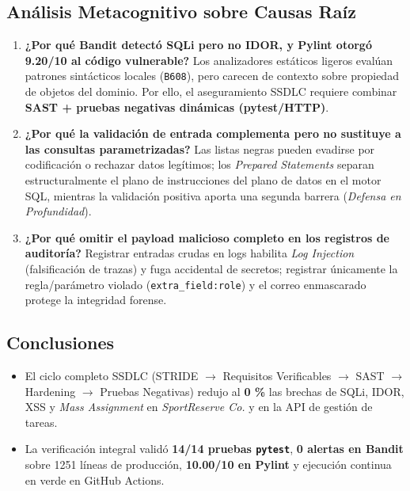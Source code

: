 \documentclass[12pt,a4paper]{article}
\begin{document}
\subsection{Análisis Metacognitivo sobre Causas Raíz}
\begin{enumerate}
    \item \textbf{¿Por qué Bandit detectó SQLi pero no IDOR, y Pylint otorgó 9.20/10 al código vulnerable?} Los analizadores estáticos ligeros evalúan patrones sintácticos locales (\texttt{B608}), pero carecen de contexto sobre propiedad de objetos del dominio. Por ello, el aseguramiento SSDLC requiere combinar \textbf{SAST + pruebas negativas dinámicas (pytest/HTTP)}.
    \item \textbf{¿Por qué la validación de entrada complementa pero no sustituye a las consultas parametrizadas?} Las listas negras pueden evadirse por codificación o rechazar datos legítimos; los \textit{Prepared Statements} separan estructuralmente el plano de instrucciones del plano de datos en el motor SQL, mientras la validación positiva aporta una segunda barrera (\textit{Defensa en Profundidad}).
    \item \textbf{¿Por qué omitir el payload malicioso completo en los registros de auditoría?} Registrar entradas crudas en logs habilita \textit{Log Injection} (falsificación de trazas) y fuga accidental de secretos; registrar únicamente la regla/parámetro violado (\texttt{extra\_field:role}) y el correo enmascarado protege la integridad forense.
\end{enumerate}

\subsection{Conclusiones}
\begin{itemize}
    \item El ciclo completo SSDLC (STRIDE $\rightarrow$ Requisitos Verificables $\rightarrow$ SAST $\rightarrow$ Hardening $\rightarrow$ Pruebas Negativas) redujo al \textbf{0 \%} las brechas de SQLi, IDOR, XSS y \textit{Mass Assignment} en \textit{SportReserve Co.} y en la API de gestión de tareas.
    \item La verificación integral validó \textbf{14/14 pruebas \texttt{pytest}}, \textbf{0 alertas en Bandit} sobre 1251 líneas de producción, \textbf{10.00/10 en Pylint} y ejecución continua en verde en GitHub Actions.
\end{itemize}
\end{document}
